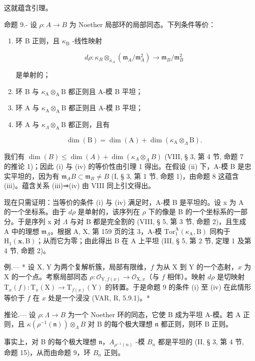 这就蕴含引理。

命题 9.- 设 \(\rho : A \to B\) 为 Noether 局部环的局部同态。下列条件等价：

\begin{enumerate}
\def\labelenumi{(\roman{enumi})}
\tightlist
\item
  环 B 正则，且 \(\kappa_{\mathrm{B}}\) -线性映射

\[
d \rho : \kappa_ {B} \otimes_ {\kappa_ {A}} \left(\mathfrak {m} _ {A} / \mathfrak {m} _ {A} ^ {2}\right) \longrightarrow \mathfrak {m} _ {B} / \mathfrak {m} _ {B} ^ {2}
\]

是单射的；

\item
  环 B 与 \(\kappa_{\mathrm{A}}\otimes_{\mathrm{A}}\mathrm{B}\) 都正则且 A-模 B 平坦；
\item
  环 A 与 \(\kappa_{\mathrm{A}}\otimes_{\mathrm{A}}\mathrm{B}\) 都正则且 A-模 B 平坦；
\item
  环 A 与 \(\kappa_{\Lambda} \otimes_{\mathrm{A}} \mathrm{B}\) 都正则，且有

\[
\dim (\mathrm{B}) = \dim (\mathrm{A}) + \dim (\kappa_ {\mathrm{A}} \otimes_ {\Lambda} \mathrm{B}).
\]
\end{enumerate}

我们有 \(\dim(B) \leqslant \dim(A) + \dim(\kappa_A \otimes_A B)\) (VIII, § 3, 第 4 节, 命题 7 的推论 1)；因此 (i) 与 (iv) 的等价性由引理 1 得出。在假设 (ii) 下，A-模 B 是忠实平坦的，因为有 \(\mathfrak{m}_A B \subset \mathfrak{m}_B \neq B\) (I, § 3, 第 1 节, 命题 1)，由命题 8 这蕴含 (iii)。蕴含关系 (iii)⇒(iv) 由 VIII 同上引文得出。

现在只需证明：当等价的条件 (i) 与 (iv) 满足时，A-模 B 是平坦的。设 x 为 A 的一个坐标系。由于 \(d\rho\) 是单射的，该序列在 \(\rho\) 下的像是 B 的一个坐标系的一部分。于是序列 x 对 \(\Lambda\) 与对 B 都是完全割的 (VIII, § 5, 第 3 节, 命题 2)，且生成 A 中的理想 \(\mathfrak{m}_{\Lambda}\)。根据 A, X, 第 159 页的注 3，A-模 \(\mathrm{Tor}_{1}^{\mathrm{A}}(\kappa_{\mathrm{A}},\mathrm{B})\) 同构于 \(\mathrm{H}_{1}(\mathbf{x},\mathrm{B})\)；从而它为零；由此得出 B 在 A 上平坦 (III, § 5, 第 2 节, 定理 1 及第 4 节, 命题 2)。

例.--- * 设 X, Y 为两个复解析簇，局部有限维，\(f\) 为从 X 到 Y 的一个态射，\(x\) 为 X 的一个点。考察局部同态 \(\rho: \mathcal{O}_{\mathrm{Y}, f(x)} \to \mathcal{O}_{\mathrm{X}, x}\)（与 \(f\) 相伴）。映射 \(d\rho\) 是切映射 \(\mathrm{T}_x(f): \mathrm{T}_x(\mathrm{X}) \to \mathrm{T}_{f(x)}(\mathrm{Y})\) 的转置。于是命题 9 的条件 (i) 至 (iv) 在此情形等价于 \(f\) 在 \(x\) 处是一个浸没 (VAR, R, 5.9.1)。*

推论.--- 设 \(\rho: \Lambda \to B\) 为一个 Noether 环的同态，它使 B 成为平坦 A-模。若 A 正则，且 \(\kappa(\rho^{-1}(\mathfrak{n})) \otimes_{\Lambda} B\) 对 B 的每个极大理想 \(\mathfrak{n}\) 都正则，则环 B 正则。

事实上，对 B 的每个极大理想 \(\mathfrak{n}\)，\(A_{\rho^{-1}(n)}\) -模 \(B_{n}\) 都是平坦的 (II, § 3, 第 4 节, 命题 15)，从而由命题 9，环 \(B_{n}\) 正则。

